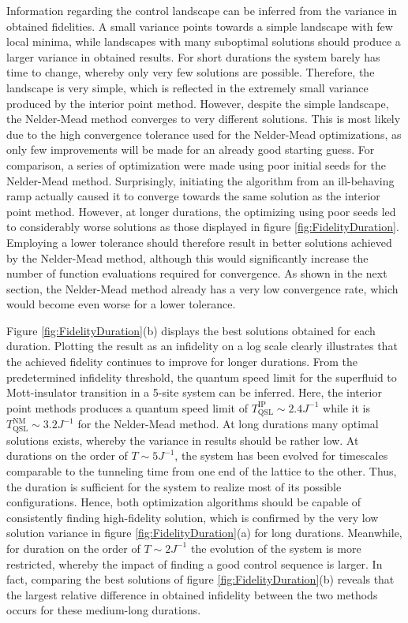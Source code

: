 Information regarding the control landscape can be inferred from the variance in obtained fidelities. A small variance points towards a simple landscape with few local minima, while landscapes with many suboptimal solutions should produce a larger variance in obtained results. For short durations the system barely has time to change, whereby only very few solutions are possible. Therefore, the landscape is very simple, which is reflected in the extremely small variance produced by the interior point method. However, despite the simple landscape, the Nelder-Mead method converges to very different solutions. This is most likely due to the high convergence tolerance used for the Nelder-Mead optimizations, as only few improvements will be made for an already good starting guess. For comparison, a series of optimization were made using poor initial seeds for the Nelder-Mead method. Surprisingly, initiating the algorithm from an ill-behaving ramp actually caused it to converge towards the same solution as the interior point method. However, at longer durations, the optimizing using poor seeds led to considerably worse solutions as those displayed in figure \ref{fig:FidelityDuration}. Employing a lower tolerance should therefore result in better solutions achieved by the Nelder-Mead method, although this would significantly increase the number of function evaluations required for convergence. As shown in the next section, the Nelder-Mead method already has a very low convergence rate, which would become even worse for a lower tolerance.

Figure \ref{fig:FidelityDuration}(b) displays the best solutions obtained for each duration. Plotting the result as an infidelity on a log scale clearly illustrates that the achieved fidelity continues to improve for longer durations. From the predetermined infidelity threshold, the quantum speed limit for the superfluid to Mott-insulator transition in a 5-site system can be inferred. Here, the interior point methods produces a quantum speed limit of $T_{\mathrm{QSL}}^{\mathrm{IP}} \sim 2.4 J^{-1}$ while it is $T_{\mathrm{QSL}}^{\mathrm{NM}} \sim 3.2 J^{-1}$ for the Nelder-Mead method. 
At long durations many optimal solutions exists, whereby the variance in results should be rather low. At durations on the order of $T \sim 5 J^{-1}$, the system has been evolved for timescales comparable to the tunneling time from one end of the lattice to the other. Thus, the duration is sufficient for the system to realize most of its possible configurations. Hence, both optimization algorithms should be capable of consistently finding high-fidelity solution, which is confirmed by the very low solution variance in figure \ref{fig:FidelityDuration}(a) for long durations. Meanwhile, for duration on the order of $T \sim 2 J^{-1}$  the evolution of the system is more restricted, whereby the impact of finding a good control sequence is larger. In fact, comparing the best solutions of figure \ref{fig:FidelityDuration}(b) reveals that the largest relative difference in obtained infidelity between the two methods occurs for these medium-long durations.\\

